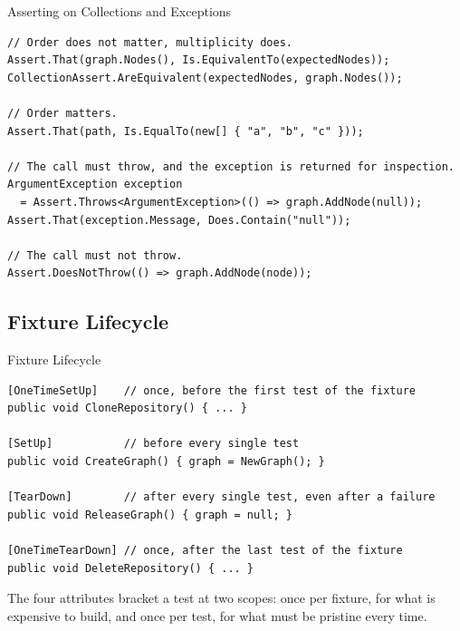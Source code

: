 \begin{frame}[fragile]{Asserting on Collections and Exceptions}
  \begin{lstlisting}[basicstyle=\scriptsize\ttfamily]
// Order does not matter, multiplicity does.
Assert.That(graph.Nodes(), Is.EquivalentTo(expectedNodes));
CollectionAssert.AreEquivalent(expectedNodes, graph.Nodes());

// Order matters.
Assert.That(path, Is.EqualTo(new[] { "a", "b", "c" }));

// The call must throw, and the exception is returned for inspection.
ArgumentException exception
  = Assert.Throws<ArgumentException>(() => graph.AddNode(null));
Assert.That(exception.Message, Does.Contain("null"));

// The call must not throw.
Assert.DoesNotThrow(() => graph.AddNode(node));
  \end{lstlisting}
  \vspace{2ex}

\end{frame}

\subsection{Fixture Lifecycle}

\begin{frame}[fragile]{Fixture Lifecycle}
  \begin{lstlisting}[basicstyle=\scriptsize\ttfamily]
[OneTimeSetUp]    // once, before the first test of the fixture
public void CloneRepository() { ... }

[SetUp]           // before every single test
public void CreateGraph() { graph = NewGraph(); }

[TearDown]        // after every single test, even after a failure
public void ReleaseGraph() { graph = null; }

[OneTimeTearDown] // once, after the last test of the fixture
public void DeleteRepository() { ... }
  \end{lstlisting}
  \vspace{1ex}

  The four attributes bracket a test at two scopes: once per fixture, for what
  is expensive to build, and once per test, for what must be pristine every
  time.
\end{frame}

